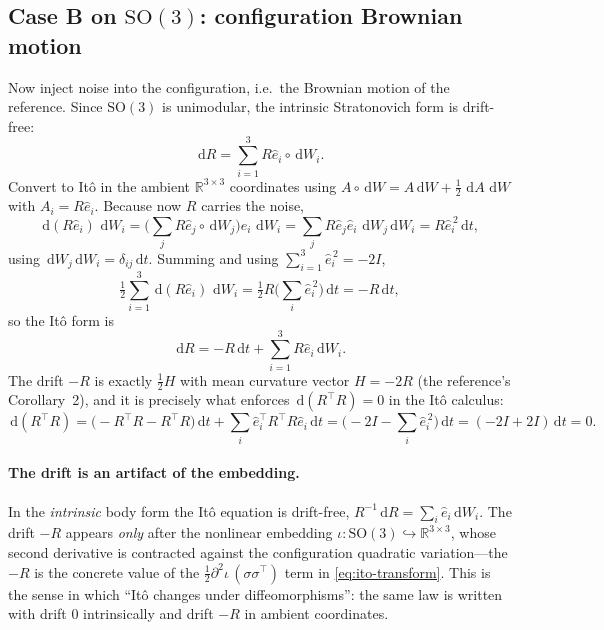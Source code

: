\documentclass[11pt]{article}
\theoremstyle{plain}
\theoremstyle{definition}
\newcommand{\SO}{\mathrm{SO}(3)}
\newcommand{\cd}{\,\mathrm{d}}          %
\newcommand{\dW}{\,\mathrm{d}W}
\newcommand{\dt}{\,\mathrm{d}t}
\newcommand{\Strat}{\circ\,\mathrm{d}W}
\newcommand{\R}{\mathbb{R}}
\newcommand{\half}{\tfrac{1}{2}}
\begin{document}
\subsection{Case B on $\SO$: configuration Brownian motion}

Now inject noise into the configuration, i.e.\ the Brownian motion of the
reference. Since $\SO$ is unimodular, the intrinsic Stratonovich form is
drift-free:
\begin{equation}
  \cd R=\sum_{i=1}^3 R\hat e_i\Strat_i. \label{eq:B-so3-strat}
\end{equation}
Convert to It\^o in the ambient $\R^{3\times3}$ coordinates using
$A\Strat=A\dW+\half\,\cd A\,\dW$ with $A_i=R\hat e_i$. Because now $R$ carries the
noise,
\begin{equation}
  \cd(R\hat e_i)\,\dW_i
  =\Big(\sum_j R\hat e_j\Strat_j\Big)\hat e_i\,\dW_i
  =\sum_j R\hat e_j\hat e_i\,\dW_j\dW_i
  =R\hat e_i^{\,2}\dt,
\end{equation}
using $\dW_j\dW_i=\delta_{ij}\dt$. Summing and using
$\sum_{i=1}^3\hat e_i^{\,2}=-2I$,
\begin{equation}
  \half\sum_{i=1}^3 \cd(R\hat e_i)\,\dW_i=\half R\Big(\sum_i\hat e_i^{\,2}\Big)\dt=-R\dt,
\end{equation}
so the It\^o form is
\begin{equation}
  \cd R=-R\dt+\sum_{i=1}^3 R\hat e_i\dW_i. \label{eq:B-so3-ito}
\end{equation}
The drift $-R$ is exactly $\half H$ with mean curvature vector $H=-2R$
(the reference's Corollary~2), and it is precisely what enforces
$\cd(R^\top R)=0$ in the It\^o calculus:
\begin{equation}
  \cd(R^\top R)=\big(\!-\!R^\top R-R^\top R\big)\dt
  +\sum_i\hat e_i^\top R^\top R\hat e_i\dt
  =\big(-2I - \textstyle\sum_i\hat e_i^{\,2}\big)\dt
  =(-2I+2I)\dt=0.
\end{equation}

\paragraph{The drift is an artifact of the embedding.}
In the \emph{intrinsic} body form the It\^o equation is drift-free,
$R^{-1}\cd R=\sum_i \hat e_i\dW_i$. The drift $-R$ appears \emph{only} after the
nonlinear embedding $\iota\colon\SO\hookrightarrow\R^{3\times3}$, whose second
derivative is contracted against the configuration quadratic variation---the
$-R$ is the concrete value of the $\half\partial^2\iota\,(\sigma\sigma^\top)$ term
in \eqref{eq:ito-transform}. This is the sense in which ``It\^o changes under
diffeomorphisms'': the same law is written with drift $0$ intrinsically and drift
$-R$ in ambient coordinates.
\end{document}
